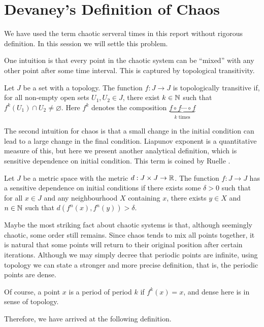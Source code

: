 \section{Devaney's Definition of Chaos}

We have used the term chaotic serveral times in this report without rigorous definition. 
In this session we will settle this problem.

One intuition is that every point in the chaotic system can be ``mixed'' with any other point after some time interval. 
This is captured by topological transitivity.
\begin{defn}
	Let $J$ be a set with a topology.
	The function $f: J \rightarrow J$ is topologically transitive if, for all non-empty open sets $U_1, U_2 \in J$, there exist $k \in \mathbb{N}$ such that $f^k(U_1) \cap U_2 \neq \varnothing$. 
	Here $f^k$ denotes the composition $\underbrace{f \circ f \cdots \circ f}_{k \text{ times}}$
\end{defn}

The second intuition for chaos is that a small change in the initial condition can lead to a large change in the final condition. 
Liapunov exponent is a quantitative measure of this, but here we present another analytical definition, which is sensitive dependence on initial condition. This term is coined by Ruelle \cite{Ruelle-1978}.
\begin{defn}
	Let $J$ be a metric space with the metric $d: J \times J \rightarrow \mathbb{R}$. The function
	$f: J \rightarrow J$ has a sensitive dependence on initial conditions if there exists some $\delta > 0$ such that for all $x \in J$ and any neighbourhood $X$ containing $x$, there exists $y \in X$ and $n \in \mathbb{N}$ such that $d(f^n(x), f^n(y)) > \delta$.
\end{defn}

Maybe the most striking fact about chaotic systems is that, although seemingly chaotic, some order still remains.
Since chaos tends to mix all points together, it is natural that some points will return to their original position after certain iterations.
Although we may simply decree that periodic points are infinite, using topology we can state a stronger and more precise definition, that is, the periodic points are dense.

Of course, a point $x$ is a period of period $k$ if $f^k(x)=x$, and dense here is in sense of topology.

Therefore, we have arrived at the following definition.

